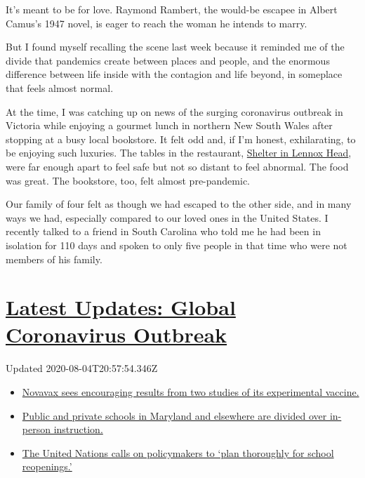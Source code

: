 It's meant to be for love. Raymond Rambert, the would-be escapee in
Albert Camus's 1947 novel, is eager to reach the woman he intends to
marry.

But I found myself recalling the scene last week because it reminded me
of the divide that pandemics create between places and people, and the
enormous difference between life inside with the contagion and life
beyond, in someplace that feels almost normal.

At the time, I was catching up on news of the surging coronavirus
outbreak in Victoria while enjoying a gourmet lunch in northern New
South Wales after stopping at a busy local bookstore. It felt odd and,
if I'm honest, exhilarating, to be enjoying such luxuries. The tables in
the restaurant,
\href{https://www.nytimes.com/2018/08/16/dining/restaurants-northern-rivers-byron-bay.html}{Shelter
in Lennox Head}, were far enough apart to feel safe but not so distant
to feel abnormal. The food was great. The bookstore, too, felt almost
pre-pandemic.

Our family of four felt as though we had escaped to the other side, and
in many ways we had, especially compared to our loved ones in the United
States. I recently talked to a friend in South Carolina who told me he
had been in isolation for 110 days and spoken to only five people in
that time who were not members of his family.

\hypertarget{latest-updates-global-coronavirus-outbreak}{%
\section{\texorpdfstring{\href{https://www.nytimes.com/2020/08/04/world/coronavirus-cases.html?action=click\&pgtype=Article\&state=default\&region=MAIN_CONTENT_1\&context=storylines_live_updates}{Latest
Updates: Global Coronavirus
Outbreak}}{Latest Updates: Global Coronavirus Outbreak}}\label{latest-updates-global-coronavirus-outbreak}}

Updated 2020-08-04T20:57:54.346Z

\begin{itemize}
\tightlist
\item
  \href{https://www.nytimes.com/2020/08/04/world/coronavirus-cases.html?action=click\&pgtype=Article\&state=default\&region=MAIN_CONTENT_1\&context=storylines_live_updates\#link-1228a480}{Novavax
  sees encouraging results from two studies of its experimental
  vaccine.}
\item
  \href{https://www.nytimes.com/2020/08/04/world/coronavirus-cases.html?action=click\&pgtype=Article\&state=default\&region=MAIN_CONTENT_1\&context=storylines_live_updates\#link-4825b93}{Public
  and private schools in Maryland and elsewhere are divided over
  in-person instruction.}
\item
  \href{https://www.nytimes.com/2020/08/04/world/coronavirus-cases.html?action=click\&pgtype=Article\&state=default\&region=MAIN_CONTENT_1\&context=storylines_live_updates\#link-50f7386d}{The
  United Nations calls on policymakers to `plan thoroughly for school
  reopenings.'}
\end{itemize}

